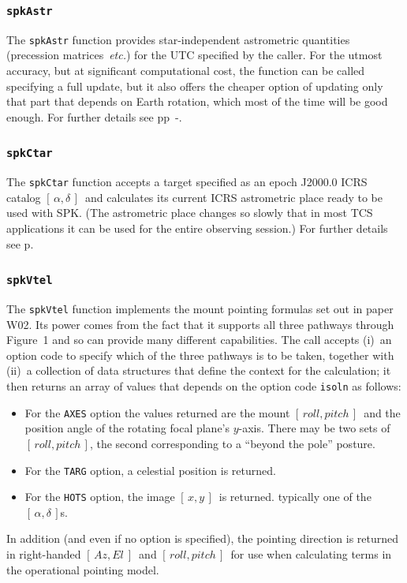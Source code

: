 \documentclass[11pt,fleqn,twoside,\paper]{article}
\renewcommand{\_}{{\tt\char'137}}     %
\newcommand{\radec}     {$[\,\alpha,\delta\,]$}
\newcommand{\azel}      {$[\,Az,El~]$}
\newcommand{\ropi}      {$[\,roll,pitch\,]$}
\newcommand{\xy}        {$[\,x,y\,]$}
\begin{document}
\subsubsection{{\tt spkAstr}}
\label{funAstr}

The {\tt spkAstr} function provides star-independent
astrometric quantities (precession matrices~{\it etc.})
for the UTC specified by the caller.  For the utmost
accuracy, but at significant computational cost, the function
can be called specifying a full update, but it also offers the
cheaper option of updating only that part that depends on Earth
rotation, which most of the time will be good enough.  For
further details see pp~\pageref{spkAstr}-\pageref{end_spkAstr}.

\subsubsection{{\tt spkCtar}}
\label{funCtar}

The {\tt spkCtar} function accepts a target specified as an
epoch J2000.0 ICRS catalog \radec\ and calculates its current
ICRS astrometric place ready to be used with SPK.  (The
astrometric place changes so slowly that in most TCS
applications it can be used for the entire observing session.)
For further details see p\pageref{spkCtar}.

\subsubsection{{\tt spkVtel}}
\label{virtel}

The {\tt spkVtel} function implements the mount pointing formulas
set out in paper W02.  Its power comes from the fact that it
supports all three pathways through Figure~1 and so can
provide many different capabilities.
The call accepts (i)~an option code to specify
which of the three pathways is to be taken, together with
(ii)~a collection of data structures that define the context
for the calculation;  it then returns an array of values that
depends on the option code {\tt isoln} as follows:
\begin{itemize}
\item For the {\tt AXES} option the values returned are the
mount \ropi\ and the position angle of the rotating focal plane's
$y$-axis.  There may be two sets of \ropi, the second corresponding
to a ``beyond the pole'' posture.
\item For the {\tt TARG} option, a celestial position is returned.
\item For the {\tt HOTS} option, the image \xy\ is returned.
typically one of the {\radec}s.
\end{itemize}
In addition (and even if no option is specified),
the pointing direction is returned in right-handed
\azel\ and \ropi\ for use when calculating terms in the
operational pointing model.
\end{document}
